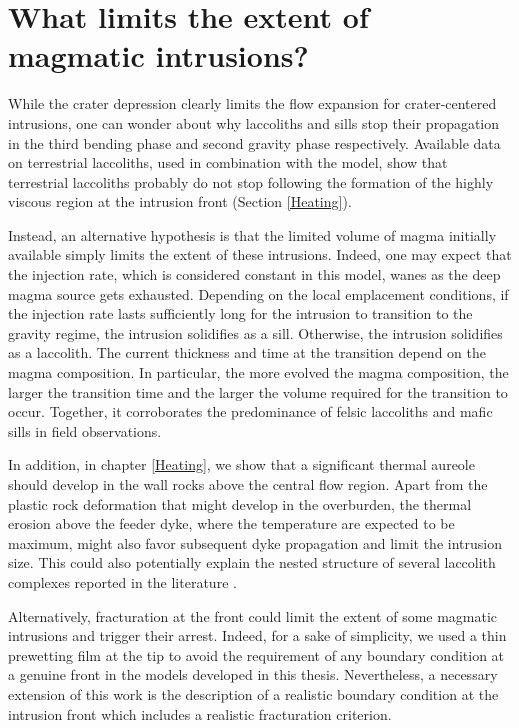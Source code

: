 \section{What limits the extent of magmatic intrusions?}
\label{C7-sec:what-limits-extent}

While  the crater  depression clearly  limits the  flow expansion  for
crater-centered intrusions,  one can  wonder about why  laccoliths and
sills stop  their propagation  in the third  bending phase  and second
gravity phase respectively. Available  data on terrestrial laccoliths,
used in combination  with the model, show  that terrestrial laccoliths
probably do  not stop  following the formation  of the  highly viscous
region at the intrusion front (Section \ref{Heating}).

Instead, an alternative hypothesis is that the limited volume of magma
initially   available    simply   limits    the   extent    of   these
intrusions. Indeed, one  may expect that the injection  rate, which is
considered constant in this model, wanes as the deep magma source gets
exhausted.   Depending on  the  local emplacement  conditions, if  the
injection rate lasts sufficiently long for the intrusion to transition
to the gravity regime, the intrusion solidifies as a sill.  Otherwise,
the intrusion  solidifies as a  laccolith.  The current  thickness and
time  at  the   transition  depend  on  the   magma  composition.   In
particular, the  more evolved  the magma  composition, the  larger the
transition time and the larger  the volume required for the transition
to  occur.   Together,  it  corroborates the  predominance  of  felsic
laccoliths and mafic sills in field observations.

In  addition, in  chapter \ref{Heating},  we show  that a  significant
thermal aureole  should develop  in the wall  rocks above  the central
flow region. Apart from the plastic rock deformation that might develop in
the overburden, the  thermal erosion above the feeder  dyke, where the
temperature are  expected to be  maximum, might also  favor subsequent
dyke  propagation  and  limit  the intrusion  size.  This  could  also
potentially  explain   the  nested  structure  of   several  laccolith
complexes reported in the literature \citep{E:2015tl,Rocchi:2010dn}.

Alternatively, fracturation  at the  front could  limit the  extent of
some magmatic intrusions and trigger  their arrest. Indeed, for a sake
of simplicity, we used a thin prewetting  film at the tip to avoid the
requirement of any boundary condition at a genuine front in the models
developed in this thesis.  Nevertheless, a necessary extension of this
work  is the  description of  a  realistic boundary  condition at  the
intrusion front which includes a realistic fracturation criterion.

